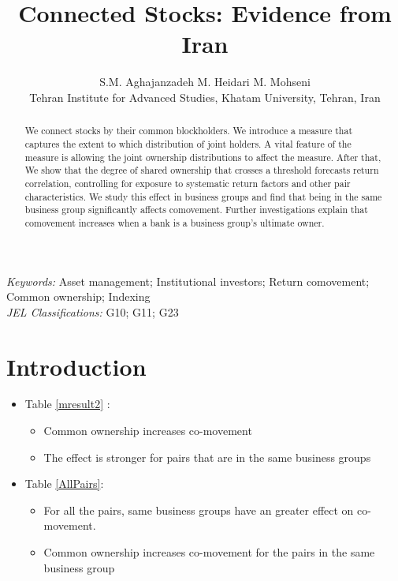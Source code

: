 \documentclass[12pt, a4paper]{article}
\title{Connected Stocks: Evidence from Iran}
\author{S.M. Aghajanzadeh\sym{*} \qquad M. Heidari\sym{*} \qquad M. Mohseni\sym{*} \\
\sym{*} \footnotesize  Tehran Institute for Advanced Studies, Khatam University, Tehran, Iran
}
\begin{document}
\maketitle


\begin{abstract}
We connect stocks by their common blockholders. We introduce a measure that captures the extent to which distribution of joint holders. A vital feature of the measure is allowing the joint ownership distributions to affect the measure. After that, We show that the degree of shared ownership that crosses a threshold forecasts return correlation, controlling for exposure to systematic return factors and other pair characteristics. We study this effect in business groups and find that being in the same business group significantly affects comovement. Further investigations explain that comovement increases when a bank is a business group's ultimate owner.
\end{abstract}

\textit{Keywords:} Asset management; Institutional investors; Return comovement; Common
ownership; Indexing 
\\

\textit{JEL Classifications:} G10; G11; G23 



\section{Introduction}


\FloatBarrier

\begin{itemize}
	\item Table \ref{mresult2} :
	\begin{itemize}
		\item Common ownership increases co-movement 
		\item The effect is stronger for pairs that are in the same business groups
	\end{itemize}
\item Table \ref{AllPairs}:
\begin{itemize}
	\item For all the pairs, same business groups have an greater effect on co-movement.
	\item Common ownership increases co-movement for the pairs in the same business group  
\end{itemize}
\end{itemize}
\end{document}
